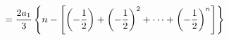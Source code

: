 \documentclass[preview]{standalone}
\begin{document}
\begin{align*}
\special{dvisvgm:raw <g id='unique000'>}=\frac{2a_1}{3}\left\{n-\left[\left(-\frac{1}{2}\right)+\left(-\frac{1}{2}\right)^2+\cdots+\left(-\frac{1}{2}\right)^n\right]\right\}\special{dvisvgm:raw </g>}
\end{align*}
\end{document}
